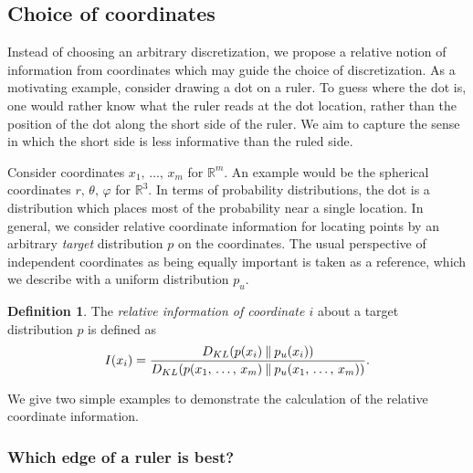 \documentclass[aps,reprint,floatfix]{revtex4-2}
\theoremstyle{plain}
\theoremstyle{definition}
\newtheorem*{defn*}{Definition}
\renewcommand\phi\varphi%
\newcommand\RR{\mathbb{R}}
\begin{document}
\subsection{Choice of coordinates}

Instead of choosing an arbitrary discretization, we propose a relative notion of
information from coordinates which may guide the choice of discretization. As a
motivating example, consider drawing a dot on a ruler. To guess where the dot
is, one would rather know what the ruler reads at the dot location, rather than
the position of the dot along the short side of the ruler. We aim to capture the
sense in which the short side is less informative than the ruled side.

Consider coordinates $x_1,\, \ldots,\, x_m$ for $\RR^m$. An example would be the
spherical coordinates $r,\, \theta,\, \phi$ for $\RR^3$. In terms of probability
distributions, the dot is a distribution which places most of the probability
near a single location. In general, we consider relative coordinate information
for locating points by an arbitrary \emph{target} distribution $p$ on the
coordinates. The usual perspective of independent coordinates as being equally
important is taken as a reference, which we describe with a uniform distribution
$p_u$.
\begin{defn*}
  The \emph{relative information of coordinate $i$} about a target distribution
  $p$ is defined as
  \begin{equation}
    I(x_i)
    = \frac{D_{KL}(p(x_i) \mathbin\| p_u(x_i))}{%
    {D_{KL}(p(x_1,\, \ldots,\, x_m) \mathbin\| p_u(x_1,\, \ldots,\, x_m))}}.
    \label{eq:relinfo}
  \end{equation}
\end{defn*}
We give two simple examples to demonstrate the calculation of the relative
coordinate information.

\subsubsection{Which edge of a ruler is best?}
\end{document}
